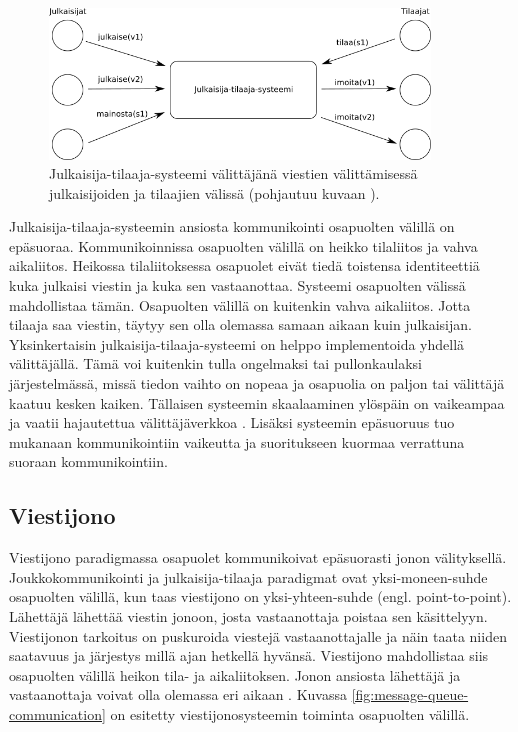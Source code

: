 \begin{figure}[ht!]
	\includegraphics[width=0.9\textwidth]{pictures/publish-subscribe.png}
	\caption{Julkaisija-tilaaja-systeemi välittäjänä viestien välittämisessä julkaisijoiden ja tilaajien välissä (pohjautuu kuvaan \mbox{\cite[s.~246]{distributed-systems-concepts-and-design}}).}
	\label{fig:publish-subscribe-communication}
\end{figure}

Julkaisija-tilaaja-systeemin ansiosta kommunikointi osapuolten välillä on epäsuoraa. Kommunikoinnissa osapuolten välillä on heikko tilaliitos ja vahva aikaliitos. Heikossa tilaliitoksessa osapuolet eivät tiedä toistensa identiteettiä kuka julkaisi viestin ja kuka sen vastaanottaa. Systeemi osapuolten välissä mahdollistaa tämän. Osapuolten välillä on kuitenkin vahva aikaliitos. Jotta tilaaja saa viestin, täytyy sen olla olemassa samaan aikaan kuin julkaisijan. Yksinkertaisin julkaisija-tilaaja-systeemi on helppo implementoida yhdellä välittäjällä. Tämä voi kuitenkin tulla ongelmaksi tai pullonkaulaksi järjestelmässä, missä tiedon vaihto on nopeaa ja osapuolia on paljon tai välittäjä kaatuu kesken kaiken. Tällaisen systeemin skaalaaminen ylöspäin on vaikeampaa ja vaatii hajautettua välittäjäverkkoa \cite[s.~248--249]{distributed-systems-concepts-and-design}. Lisäksi systeemin epäsuoruus tuo mukanaan kommunikointiin vaikeutta ja suoritukseen kuormaa verrattuna suoraan kommunikointiin.


\subsection{Viestijono}
Viestijono paradigmassa osapuolet kommunikoivat epäsuorasti jonon välityksellä. Joukkokommunikointi ja julkaisija-tilaaja paradigmat ovat yksi-moneen-suhde osapuolten välillä, kun taas viestijono on yksi-yhteen-suhde (engl. point-to-point). Lähettäjä lähettää viestin jonoon, josta vastaanottaja poistaa sen käsittelyyn. Viestijonon tarkoitus on puskuroida viestejä vastaanottajalle ja näin taata niiden saatavuus ja järjestys millä ajan hetkellä hyvänsä. Viestijono mahdollistaa siis osapuolten välillä heikon tila- ja aikaliitoksen. Jonon ansiosta lähettäjä ja vastaanottaja voivat olla olemassa eri aikaan \cite[s.~254]{distributed-systems-concepts-and-design}. Kuvassa \ref{fig:message-queue-communication} on esitetty viestijonosysteemin toiminta osapuolten välillä.

